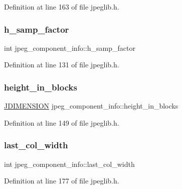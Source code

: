 Definition at line 163 of file jpeglib.\+h.

\mbox{\label{structjpeg__component__info_a3a8e122fa2eee3c7bede586d371fe202}} 
\subsubsection{\texorpdfstring{h\_samp\_factor}{h\_samp\_factor}}
{\footnotesize\ttfamily int jpeg\+\_\+component\+\_\+info\+::h\+\_\+samp\+\_\+factor}



Definition at line 131 of file jpeglib.\+h.

\mbox{\label{structjpeg__component__info_a3f9218e7590c328bfd88d900f58886f4}} 
\subsubsection{\texorpdfstring{height\_in\_blocks}{height\_in\_blocks}}
{\footnotesize\ttfamily \mbox{\hyperlink{jmorecfg_8h_a04ed4674f6f1d0d50ec241531e38274f}{J\+D\+I\+M\+E\+N\+S\+I\+ON}} jpeg\+\_\+component\+\_\+info\+::height\+\_\+in\+\_\+blocks}



Definition at line 149 of file jpeglib.\+h.

\mbox{\label{structjpeg__component__info_a440612272e3e9eac0a240fd34cde5bbe}} 
\subsubsection{\texorpdfstring{last\_col\_width}{last\_col\_width}}
{\footnotesize\ttfamily int jpeg\+\_\+component\+\_\+info\+::last\+\_\+col\+\_\+width}



Definition at line 177 of file jpeglib.\+h.

